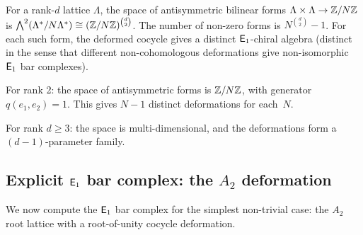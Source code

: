 \begin{remark}
\label{rem:lattice:deformation-space}
For a rank-$d$ lattice $\Lambda$, the space of antisymmetric
bilinear forms $\Lambda \times \Lambda \to \mathbb{Z}/N\mathbb{Z}$ is
$\bigwedge^2(\Lambda^*/N\Lambda^*) \cong (\mathbb{Z}/N\mathbb{Z})^{\binom{d}{2}}$.
The number of non-zero forms is $N^{\binom{d}{2}} - 1$.  For each
such form, the deformed cocycle gives a distinct $\mathsf{E}_1$-chiral
algebra (distinct in the sense that different non-cohomologous
deformations give non-isomorphic $\mathsf{E}_1$ bar complexes).

For rank 2: the space of antisymmetric forms is $\mathbb{Z}/N\mathbb{Z}$, with
generator $q(e_1, e_2) = 1$.  This gives $N - 1$ distinct
deformations for each~$N$.

For rank $d \geq 3$: the space is multi-dimensional, and the
deformations form a $(d-1)$-parameter family.
\end{remark}


\subsection{Explicit $\mathsf{E}_1$ bar complex: the $A_2$ deformation}

We now compute the $\mathsf{E}_1$ bar complex for the simplest
non-trivial case: the $A_2$ root lattice with a root-of-unity
cocycle deformation.

